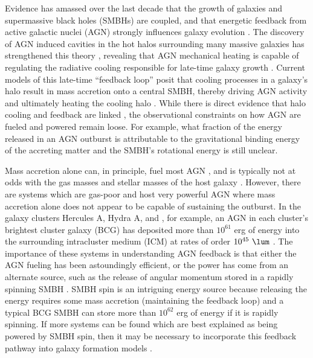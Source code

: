 \documentclass[11pt, preprint]{aastex}
\begin{document}
Evidence has amassed over the last decade that the growth of galaxies
and supermassive black holes (SMBHs) are coupled, and that energetic
feedback from active galactic nuclei (AGN) strongly influences galaxy
evolution \citep[\eg][]{1995ARA&A..33..581K, magorrian,
  1998A&A...331L...1S, 2000MNRAS.311..576K, 2000ApJ...539L...9F,
  2000ApJ...539L..13G, 2002ApJ...574..740T}. The discovery of AGN
induced cavities in the hot halos surrounding many massive galaxies
has strengthened this theory \citep[see][for a review]{mcnamrev},
revealing that AGN mechanical heating is capable of regulating the
radiative cooling responsible for late-time galaxy growth
\citep[\eg][]{birzan04, dunn06, rafferty06}. Current models of this
late-time ``feedback loop'' posit that cooling processes in a galaxy's
halo result in mass accretion onto a central SMBH, thereby driving AGN
activity and ultimately heating the cooling halo
\citep[\eg][]{croton06, bower06, sijacki07}. While there is direct
evidence that halo cooling and feedback are linked
\citep[\eg][]{haradent, rafferty08}, the observational constraints on
how AGN are fueled and powered remain loose. For example, what
fraction of the energy released in an AGN outburst is attributable to
the gravitational binding energy of the accreting matter
\citep[see][for a review]{1984RvMP...56..255B} and the SMBH's
rotational energy \citep[see][for a review]{2002NewAR..46..247M} is
still unclear.

Mass accretion alone can, in principle, fuel most AGN
\citep[\eg][]{pizzolato05, 2006MNRAS.372...21A}, and is typically not
at odds with the gas masses and stellar masses of the host galaxy
\citep[\eg][]{rafferty06}. However, there are systems which are
gas-poor and host very powerful AGN where mass accretion alone does
not appear to be capable of sustaining the outburst. In the galaxy
clusters Hercules A, Hydra A, and \ms, for example, an AGN in each
cluster's brightest cluster galaxy (BCG) has deposited more than
$10^{61}$ erg of energy into the surrounding intracluster medium (ICM)
at rates of order $10^{45} ~\lum$ \citep{herca, hydraa, ms0735}. The
importance of these systems in understanding AGN feedback is that
either the AGN fueling has been astoundingly efficient, or the power
has come from an alternate source, such as the release of angular
momentum stored in a rapidly spinning SMBH \citep[\eg][]{msspin,
  minaspin}. SMBH spin is an intriguing energy source because
releasing the energy requires some mass accretion (maintaining the
feedback loop) and a typical BCG SMBH can store more than $10^{62}$
erg of energy if it is rapidly spinning. If more systems can be found
which are best explained as being powered by SMBH spin, then it may be
necessary to incorporate this feedback pathway into galaxy formation
models \citep[\eg][]{2003ApJ...585L.101H, 2007ApJ...658..815S,
  2009MNRAS.397.1302B, gesspin}.
\end{document}
